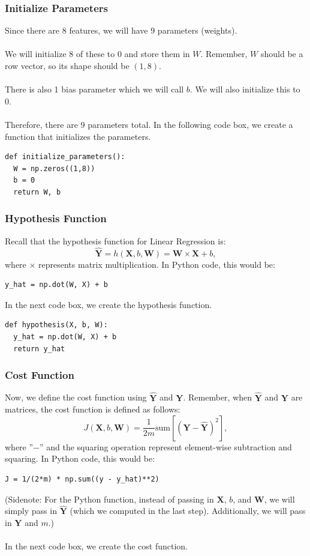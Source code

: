 \documentclass{article}
\begin{document}
\subsubsection{Initialize Parameters}
Since there are 8 features, we will have 9 parameters (weights). 
\\
\\
We will initialize 8 of these to 0 and store them in $W$. Remember, $W$ should be a row vector, so its shape should be $(1,8)$.
\\
\\
There is also 1 bias parameter which we will call $b$. We will also initialize this to 0.
\\
\\
Therefore, there are 9 parameters total. In the following code box, we create a function that initializes the parameters.

\begin{lstlisting}
def initialize_parameters():
  W = np.zeros((1,8))
  b = 0
  return W, b
\end{lstlisting}

\subsubsection{Hypothesis Function}
Recall that the hypothesis function for Linear Regression is:
$$\hat{\textbf{Y}}=h(\textbf{X},b,\textbf{W})=\textbf{W}\times \textbf{X} + b,$$
where $\times$ represents matrix multiplication. In Python code, this would be:
\begin{lstlisting}
y_hat = np.dot(W, X) + b
\end{lstlisting}
In the next code box, we create the hypothesis function.
\begin{lstlisting}
def hypothesis(X, b, W):
  y_hat = np.dot(W, X) + b
  return y_hat
\end{lstlisting}

\subsubsection{Cost Function}
Now, we define the cost function using $\hat{\textbf{Y}}$ and $\textbf{Y}$. Remember, when $\hat{\textbf{Y}}$ and $\textbf{Y}$ are matrices, the cost function is defined as follows:
$$J(\textbf{X},b,\textbf{W})=\frac{1}{2m} \text{sum}\left[(\textbf{Y}-\hat{\textbf{Y}})^2\right],$$
where ''$-$'' and the squaring operation represent element-wise subtraction and squaring. In Python code, this would be:
\begin{lstlisting}
J = 1/(2*m) * np.sum((y - y_hat)**2)
\end{lstlisting}
(Sidenote: For the Python function, instead of passing in $\textbf{X}$, $b$, and $\textbf{W}$, we will simply pass in $\hat{\textbf{Y}}$ (which we computed in the last step). Additionally, we will pass in $\textbf{Y}$ and $m$.) 
\\
\\
In the next code box, we create the cost function.
\end{document}

